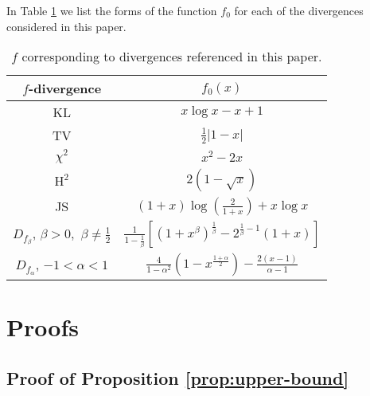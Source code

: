 In Table \ref{table:f-fns} we list the forms of the function $f_0$ for each of the divergences considered in this paper.


{
\renewcommand{\arraystretch}{2}
\begin{table}
 \caption{$f$ corresponding to divergences referenced in this paper.}
 \label{table:f-fns}
 \centering
 \begin{tabular}{c c} 
 \toprule
 $f$-divergence & $f_0(x)$ \\
 \midrule
 KL & $x \log x - x + 1$\\
 TV & $\frac{1}{2}|1-x|$\\
 $\chi^2$ & $x^2 - 2x$\\
 $\text{H}^2$ & $2(1-\sqrt{x})$\\
 JS & $(1+x)\log(\frac{2}{1+x}) + x\log x$\\
 $D_{f_\beta}$, $\beta > 0,$ $\beta\not=\frac{1}{2}$ & $\frac{1}{1-\frac{1}{\beta}}\left[ (1+x^\beta)^{\frac{1}{\beta}} - 2^{\frac{1}{\beta}-1}(1+x) \right]$\\
 $D_{f_\alpha}$, $-1<\alpha < 1$ & $\frac{4}{1-\alpha^2}\left( 1 - x^{\frac{1+\alpha}{2}} \right) - \frac{2(x-1)}{\alpha-1}$ \\
 \bottomrule
\end{tabular}
\end{table}
}

\section{Proofs}\label{appendix:proofs}

\subsection{Proof of Proposition \ref{prop:upper-bound}}\label{proof:prop1}

